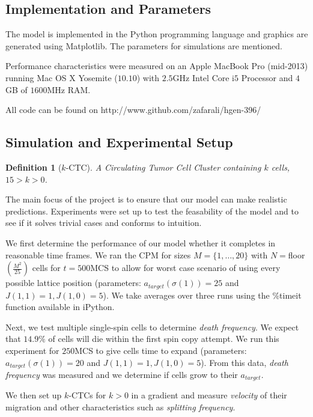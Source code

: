 \documentclass[12pt]{article}
\newtheorem{definition}{Definition}
\begin{document}
\subsection{Implementation and Parameters}
The model is implemented in the Python programming language and graphics are generated using Matplotlib\cite{matplotlib}. The parameters for simulations are mentioned.

Performance characteristics were measured on an Apple MacBook Pro (mid-2013) running Mac OS X Yosemite ($10.10$) with $2.5$GHz Intel Core i$5$ Processor and $4$GB of $1600$MHz RAM.

All code can be found on http://www.github.com/zafarali/hgen-396/

\subsection{Simulation and Experimental Setup}
\begin{definition}[$k$-CTC]
A Circulating Tumor Cell Cluster containing $k$ cells, $15>k>0$.
\end{definition}

The main focus of the project is to ensure that our model can make realistic predictions. Experiments were set up to test the feasability of the model and to see if it solves trivial cases and conforms to intuition.

We first determine the performance of our model whether it completes in reasonable time frames. We ran the CPM for sizes $M=\{1, \ldots , 20\}$ with $N=$floor$(\frac{M^2}{25})$ cells for $t=500$MCS to allow for worst case scenario of using every possible lattice position (parameters: $a_{target}(\sigma(1))=25$ and $J(1,1)=1, J(1,0)=5$). We take averages over three runs using the \%timeit function available in iPython.

Next, we test multiple single-spin cells to determine \emph{death frequency}. We expect that $14.9\%$ of cells will die within the first spin copy attempt. We run this experiment for $250$MCS to give cells time to expand (parameters: $a_{target}(\sigma(1))=20$ and $J(1,1)=1, J(1,0)=5$).
From this data, \emph{death frequency} was measured and we determine if cells grow to their $a_{target}$.

We then set up $k$-CTCs for $k>0$ in a gradient and measure \emph{velocity} of their migration and other characteristics such as \emph{splitting frequency}.

\end{document}

